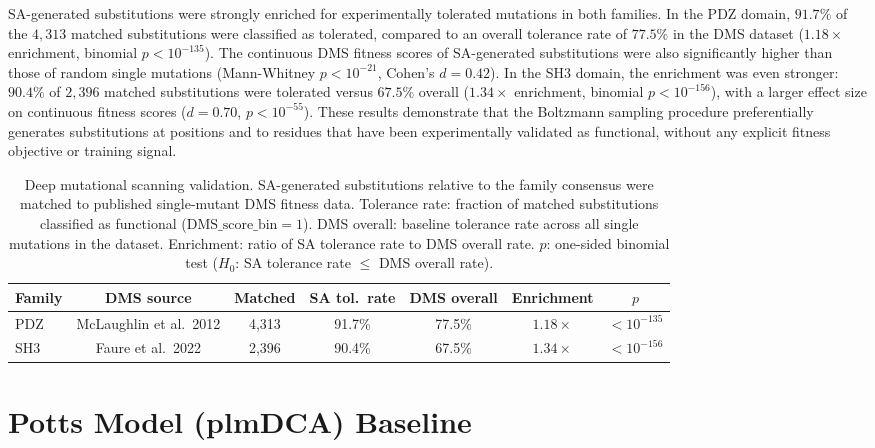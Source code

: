 SA-generated substitutions were strongly enriched for experimentally tolerated mutations in both families. In the PDZ domain, $91.7\%$ of the $4{,}313$ matched substitutions were classified as tolerated, compared to an overall tolerance rate of $77.5\%$ in the DMS dataset ($1.18\times$ enrichment, binomial $p < 10^{-135}$). The continuous DMS fitness scores of SA-generated substitutions were also significantly higher than those of random single mutations (Mann-Whitney $p < 10^{-21}$, Cohen's $d{=}0.42$). In the SH3 domain, the enrichment was even stronger: $90.4\%$ of $2{,}396$ matched substitutions were tolerated versus $67.5\%$ overall ($1.34\times$ enrichment, binomial $p < 10^{-156}$), with a larger effect size on continuous fitness scores ($d{=}0.70$, $p < 10^{-55}$). These results demonstrate that the Boltzmann sampling procedure preferentially generates substitutions at positions and to residues that have been experimentally validated as functional, without any explicit fitness objective or training signal.

\begin{table}[ht]
\centering
\caption{Deep mutational scanning validation. SA-generated substitutions relative to the family consensus were matched to published single-mutant DMS fitness data. Tolerance rate: fraction of matched substitutions classified as functional ($\mathrm{DMS\_score\_bin}{=}1$). DMS overall: baseline tolerance rate across all single mutations in the dataset. Enrichment: ratio of SA tolerance rate to DMS overall rate. $p$: one-sided binomial test ($H_0$: SA tolerance rate $\leq$ DMS overall rate).}
\label{tab:dms}
\small
\begin{tabular}{@{}lcccccc@{}}
\toprule
Family & DMS source & Matched & SA tol.\ rate & DMS overall & Enrichment & $p$ \\
\midrule
PDZ & McLaughlin et al.\ 2012 & 4{,}313 & 91.7\% & 77.5\% & $1.18\times$ & $<10^{-135}$ \\
SH3 & Faure et al.\ 2022      & 2{,}396 & 90.4\% & 67.5\% & $1.34\times$ & $<10^{-156}$ \\
\bottomrule
\end{tabular}
\end{table}

\section{Potts Model (plmDCA) Baseline}\label{si:potts}

